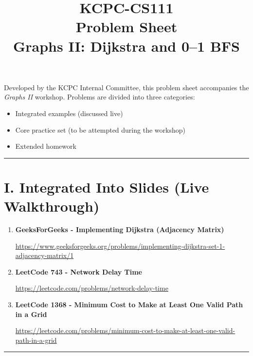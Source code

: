 \documentclass[11pt]{article}
\title{KCPC-CS111 \\ Problem Sheet \\ Graphs II: Dijkstra and 0--1 BFS}
\author{}
\date{}
\begin{document}
\maketitle

\noindent
Developed by the KCPC Internal Committee, this problem sheet accompanies the \textit{Graphs II} workshop.  
Problems are divided into three categories:
\begin{itemize}
    \item Integrated examples (discussed live)
    \item Core practice set (to be attempted during the workshop)
    \item Extended homework
\end{itemize}

\hrule
\vspace{1em}

\section*{I. Integrated Into Slides (Live Walkthrough)}

\begin{enumerate}
    \item \textbf{GeeksForGeeks - Implementing Dijkstra (Adjacency Matrix)}  
    
    \vspace{0.3em}
    {\url{https://www.geeksforgeeks.org/problems/implementing-dijkstra-set-1-adjacency-matrix/1}}

    \vspace{0.8em}

    \item \textbf{LeetCode 743 - Network Delay Time}  

    \vspace{0.3em}
    {\url{https://leetcode.com/problems/network-delay-time}}

        \vspace{0.8em}

    \item \textbf{LeetCode 1368 - Minimum Cost to Make at Least One Valid Path in a Grid}  

    \vspace{0.3em}
    {\url{https://leetcode.com/problems/minimum-cost-to-make-at-least-one-valid-path-in-a-grid}}

\end{enumerate}

\vspace{1em}
\hrule
\vspace{1em}
\end{document}
